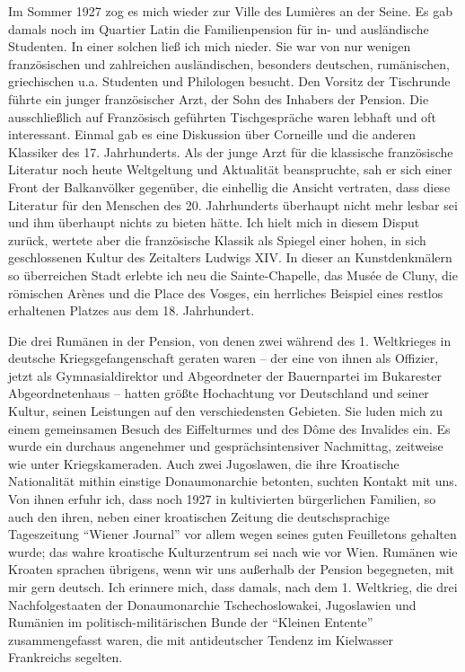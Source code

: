 Im Sommer 1927 zog es mich wieder zur Ville des Lumières an der Seine. Es gab damals noch im Quartier Latin die Familienpension für in- und ausländische Studenten. In einer solchen ließ ich mich nieder. Sie war von nur wenigen französischen und zahlreichen ausländischen, besonders deutschen, rumänischen, griechischen u.a. Studenten und Philologen besucht. Den Vorsitz der Tischrunde führte ein junger französischer Arzt, der Sohn des Inhabers der Pension. Die ausschließlich auf Französisch geführten Tischgespräche waren lebhaft und oft interessant. Einmal gab es eine Diskussion über Corneille und die anderen Klassiker des 17. Jahrhunderts. Als der junge Arzt für die klassische französische Literatur noch heute Weltgeltung und Aktualität beanspruchte, sah er sich einer Front der Balkanvölker gegenüber, die einhellig die Ansicht vertraten, dass diese Literatur für den Menschen des 20. Jahrhunderts überhaupt nicht mehr lesbar sei und ihm überhaupt nichts zu bieten hätte. Ich hielt mich in diesem Disput zurück, wertete aber die französische Klassik als Spiegel einer hohen, in sich geschlossenen Kultur des Zeitalters Ludwigs XIV. In dieser an Kunstdenkmälern so überreichen Stadt erlebte ich neu die Sainte-Chapelle, das Musée de Cluny, die römischen Arènes und die Place des Vosges, ein herrliches Beispiel eines restlos erhaltenen Platzes aus dem 18. Jahrhundert.

Die drei Rumänen in der Pension, von denen zwei während des 1. Weltkrieges in deutsche Kriegsgefangenschaft geraten waren -- der eine von ihnen als Offizier, jetzt als Gymnasialdirektor und Abgeordneter der Bauernpartei im Bukarester Abgeordnetenhaus -- hatten größte Hochachtung vor Deutschland und seiner Kultur, seinen Leistungen auf den verschiedensten Gebieten. Sie luden mich zu einem gemeinsamen Besuch des Eiffelturmes und des Dôme des Invalides ein. Es wurde ein durchaus angenehmer und gesprächsintensiver Nachmittag, zeitweise wie unter Kriegskameraden. Auch zwei Jugoslawen, die ihre Kroatische Nationalität mithin einstige Donaumonarchie betonten, suchten Kontakt mit uns. Von ihnen erfuhr ich, dass noch 1927 in kultivierten bürgerlichen Familien, so auch den ihren, neben einer kroatischen Zeitung die deutschsprachige Tageszeitung \enquote{Wiener Journal} vor allem wegen seines guten Feuilletons gehalten wurde; das wahre kroatische Kulturzentrum sei nach wie vor Wien. Rumänen wie Kroaten sprachen übrigens, wenn wir uns außerhalb der Pension begegneten, mit mir gern deutsch. Ich erinnere mich, dass damals, nach dem 1. Weltkrieg, die drei Nachfolgestaaten der Donaumonarchie Tschechoslowakei, Jugoslawien und Rumänien im politisch-militärischen Bunde der \enquote{Kleinen Entente} zusammengefasst waren, die mit antideutscher Tendenz im Kielwasser Frankreichs segelten.

